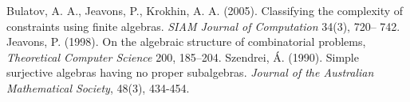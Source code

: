 \documentclass{amsart}
\theoremstyle{plain}
\theoremstyle{definition}
\theoremstyle{remark}
\begin{document}
\begin{thebibliography}{9}
    Bulatov, A. A.,  Jeavons, P., Krokhin, A. A. (2005). Classifying the complexity of constraints using finite algebras. \emph{SIAM Journal of Computation} 34(3), 720– 742.
    Jeavons, P. (1998). On the algebraic structure of combinatorial problems, \emph{Theoretical Computer Science} 200, 185–204.
    Szendrei, Á. (1990). Simple surjective algebras having no proper subalgebras. \emph{Journal of the Australian Mathematical Society}, 48(3), 434-454. 
 \end{thebibliography}
\end{document}
